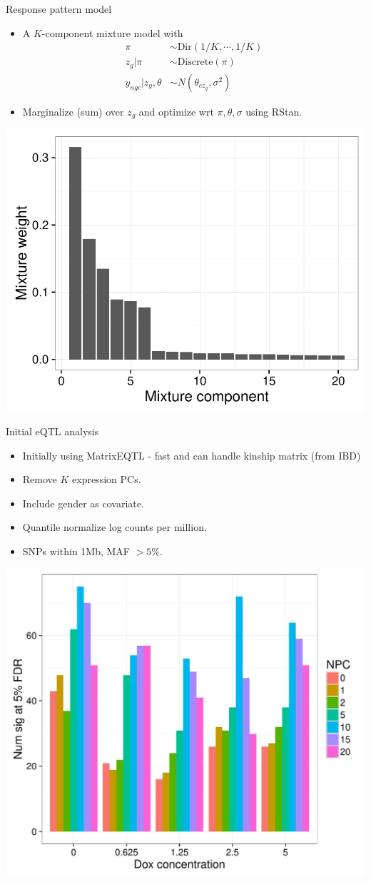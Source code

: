 \documentclass{beamer}
\begin{document}
\begin{frame}{Response pattern model}
\begin{itemize}
\item A $K$-component mixture model with
\begin{align*}
\pi &\sim \text{Dir}(1/K,\cdots,1/K) \\
z_g | \pi &\sim \text{Discrete}(\pi) \\
y_{ngc} | z_g, \theta &\sim N( \theta_{cz_g}, \sigma^2 )
\end{align*}
\item Marginalize (sum) over $z_g$ and optimize wrt $\pi, \theta, \sigma$ using RStan. 
\end{itemize}
\centering
\includegraphics[width=.4\textwidth,clip,trim=0 0 0 0]{../figures/mixture_pi.pdf}
\end{frame}

\begin{frame}{Initial eQTL analysis}
\begin{itemize}
\item Initially using MatrixEQTL - fast and can handle kinship matrix (from IBD)
\item Remove $K$ expression PCs.
\item Include gender as covariate. 
\item Quantile normalize log counts per million. 
\item SNPs within 1Mb, MAF $>5\%$. 
\end{itemize}
\centering
\includegraphics[width=.6\textwidth,clip,trim=0 0 0 0]{../figures/matrixEQTL_nsig.pdf}
\end{frame}
\end{document}
